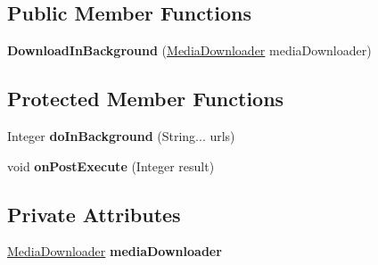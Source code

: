 \subsection*{Public Member Functions}
\begin{DoxyCompactItemize}
\item 
{\bfseries Download\+In\+Background} (\hyperlink{classcom_1_1example_1_1sebastian_1_1tindertp_1_1internetTools_1_1MediaDownloader}{Media\+Downloader} media\+Downloader)\hypertarget{classcom_1_1example_1_1sebastian_1_1tindertp_1_1internetTools_1_1DownloadInBackground_ac9efa075b5917ecbf87ca23bfeddc9ef}{}\label{classcom_1_1example_1_1sebastian_1_1tindertp_1_1internetTools_1_1DownloadInBackground_ac9efa075b5917ecbf87ca23bfeddc9ef}

\end{DoxyCompactItemize}
\subsection*{Protected Member Functions}
\begin{DoxyCompactItemize}
\item 
Integer {\bfseries do\+In\+Background} (String... urls)\hypertarget{classcom_1_1example_1_1sebastian_1_1tindertp_1_1internetTools_1_1DownloadInBackground_aa83aa459e539fded062da68c9dc7552b}{}\label{classcom_1_1example_1_1sebastian_1_1tindertp_1_1internetTools_1_1DownloadInBackground_aa83aa459e539fded062da68c9dc7552b}

\item 
void {\bfseries on\+Post\+Execute} (Integer result)\hypertarget{classcom_1_1example_1_1sebastian_1_1tindertp_1_1internetTools_1_1DownloadInBackground_a2d8d463b091a67d013f02ba410d361c0}{}\label{classcom_1_1example_1_1sebastian_1_1tindertp_1_1internetTools_1_1DownloadInBackground_a2d8d463b091a67d013f02ba410d361c0}

\end{DoxyCompactItemize}
\subsection*{Private Attributes}
\begin{DoxyCompactItemize}
\item 
\hyperlink{classcom_1_1example_1_1sebastian_1_1tindertp_1_1internetTools_1_1MediaDownloader}{Media\+Downloader} {\bfseries media\+Downloader}\hypertarget{classcom_1_1example_1_1sebastian_1_1tindertp_1_1internetTools_1_1DownloadInBackground_ae7bb83586c2f28c1bb6b2a1737a22982}{}\label{classcom_1_1example_1_1sebastian_1_1tindertp_1_1internetTools_1_1DownloadInBackground_ae7bb83586c2f28c1bb6b2a1737a22982}

\end{DoxyCompactItemize}
